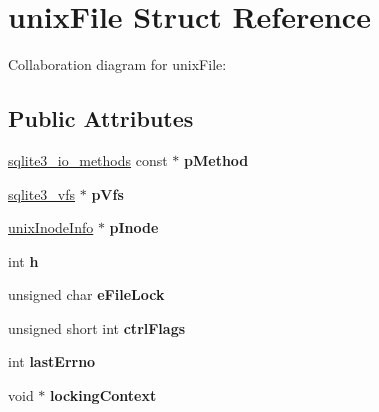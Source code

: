 \hypertarget{structunix_file}{\section{unix\+File Struct Reference}
\label{structunix_file}
}


Collaboration diagram for unix\+File\+:
\subsection*{Public Attributes}
\begin{DoxyCompactItemize}
\item 
\hypertarget{structunix_file_a2a2b40e965f91aa9ee21135bfb0c17ec}{\hyperlink{structsqlite3__io__methods}{sqlite3\+\_\+io\+\_\+methods} const $\ast$ {\bfseries p\+Method}}\label{structunix_file_a2a2b40e965f91aa9ee21135bfb0c17ec}

\item 
\hypertarget{structunix_file_a048d696479bb2544ab2cec1ac9a75d67}{\hyperlink{structsqlite3__vfs}{sqlite3\+\_\+vfs} $\ast$ {\bfseries p\+Vfs}}\label{structunix_file_a048d696479bb2544ab2cec1ac9a75d67}

\item 
\hypertarget{structunix_file_ac17292fe29bb6cc9eceed9db6d1209e8}{\hyperlink{structunix_inode_info}{unix\+Inode\+Info} $\ast$ {\bfseries p\+Inode}}\label{structunix_file_ac17292fe29bb6cc9eceed9db6d1209e8}

\item 
\hypertarget{structunix_file_a1c58798d4ff3ac6232765c8b76bb7450}{int {\bfseries h}}\label{structunix_file_a1c58798d4ff3ac6232765c8b76bb7450}

\item 
\hypertarget{structunix_file_a001e59bdb9d3f396952c2c8e3229f7fc}{unsigned char {\bfseries e\+File\+Lock}}\label{structunix_file_a001e59bdb9d3f396952c2c8e3229f7fc}

\item 
\hypertarget{structunix_file_a05d9d0af8aa4d9de6a250984cc12ae56}{unsigned short int {\bfseries ctrl\+Flags}}\label{structunix_file_a05d9d0af8aa4d9de6a250984cc12ae56}

\item 
\hypertarget{structunix_file_afde57c2e118fac8041918dac2ee6f7d1}{int {\bfseries last\+Errno}}\label{structunix_file_afde57c2e118fac8041918dac2ee6f7d1}

\item 
\hypertarget{structunix_file_afaeb4425a6de3e913db4b03e8a0d098a}{void $\ast$ {\bfseries locking\+Context}}\label{structunix_file_afaeb4425a6de3e913db4b03e8a0d098a}


\end{DoxyCompactItemize}
